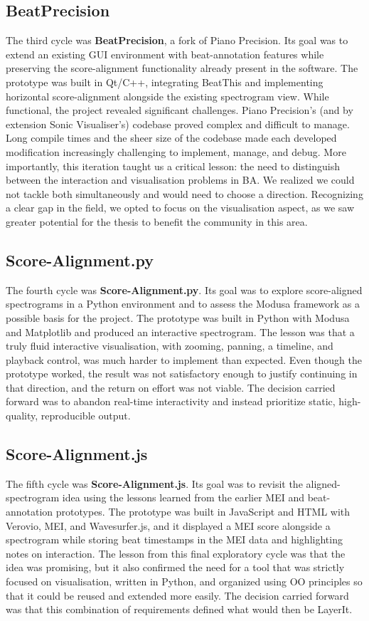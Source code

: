 \subsection{BeatPrecision}
The third cycle was \textbf{BeatPrecision}, a fork of Piano Precision. Its goal was to extend an existing GUI environment with beat-annotation features while preserving the score-alignment functionality already present in the software. The prototype was built in Qt/C++, integrating BeatThis and implementing horizontal score-alignment alongside the existing spectrogram view. While functional, the project revealed significant challenges. Piano Precision's (and by extension Sonic Visualiser's) codebase proved complex and difficult to manage. Long compile times and the sheer size of the codebase made each developed modification increasingly challenging to implement, manage, and debug. More importantly, this iteration taught us a critical lesson: the need to distinguish between the interaction and visualisation problems in BA. We realized we could not tackle both simultaneously and would need to choose a direction. Recognizing a clear gap in the field, we opted to focus on the visualisation aspect, as we saw greater potential for the thesis to benefit the community in this area. 

\subsection{Score-Alignment.py}
The fourth cycle was \textbf{Score-Alignment.py}. Its goal was to explore score-aligned spectrograms in a Python environment and to assess the Modusa framework as a possible basis for the project. The prototype was built in Python with Modusa and Matplotlib and produced an interactive spectrogram. The lesson was that a truly fluid interactive visualisation, with zooming, panning, a timeline, and playback control, was much harder to implement than expected. Even though the prototype worked, the result was not satisfactory enough to justify continuing in that direction, and the return on effort was not viable. The decision carried forward was to abandon real-time interactivity and instead prioritize static, high-quality, reproducible output.

\subsection{Score-Alignment.js}
The fifth cycle was \textbf{Score-Alignment.js}. Its goal was to revisit the aligned-spectrogram idea using the lessons learned from the earlier MEI and beat-annotation prototypes. The prototype was built in JavaScript and HTML with Verovio, MEI, and Wavesurfer.js, and it displayed a MEI score alongside a spectrogram while storing beat timestamps in the MEI data and highlighting notes on interaction. The lesson from this final exploratory cycle was that the idea was promising, but it also confirmed the need for a tool that was strictly focused on visualisation, written in Python, and organized using OO principles so that it could be reused and extended more easily. The decision carried forward was that this combination of requirements defined what would then be LayerIt.

